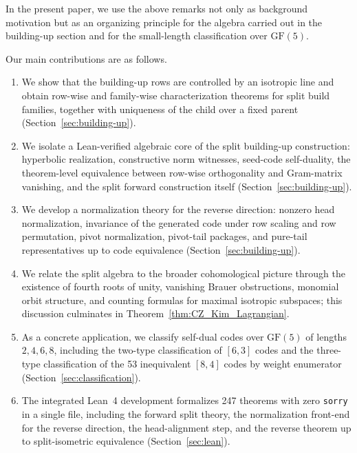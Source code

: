 \documentclass[12pt]{article}
\newcommand{\GF}[1]{\ensuremath{\mathrm{GF}(#1)}}
\begin{document}
In the present paper, we use the above remarks not only as background motivation but as an organizing principle for the algebra carried out in the building-up section and for the small-length classification over $\GF{5}$.

Our main contributions are as follows.
\begin{enumerate}[label=(\arabic*)]

\item We show that the building-up rows are controlled by an isotropic line and obtain row-wise and family-wise characterization theorems for split build families, together with uniqueness of the child over a fixed parent (Section~\ref{sec:building-up}).

\item We isolate a Lean-verified algebraic core of the split building-up construction: hyperbolic realization, constructive norm witnesses, seed-code self-duality, the theorem-level equivalence between row-wise orthogonality and Gram-matrix vanishing, and the split forward construction itself (Section~\ref{sec:building-up}).

\item We develop a normalization theory for the reverse direction: nonzero head normalization, invariance of the generated code under row scaling and row permutation, pivot normalization, pivot-tail packages, and pure-tail representatives up to code equivalence (Section~\ref{sec:building-up}).

\item We relate the split algebra to the broader cohomological picture through the existence of fourth roots of unity, vanishing Brauer obstructions, monomial orbit structure, and counting formulas for maximal isotropic subspaces; this discussion culminates in Theorem~\ref{thm:CZ_Kim_Lagrangian}.

\item As a concrete application, we classify self-dual codes over $\GF{5}$ of lengths $2,4,6,8$, including the two-type classification of $[6,3]$ codes and the three-type classification of the 53 inequivalent $[8,4]$ codes by weight enumerator (Section~\ref{sec:classification}).

\item The integrated Lean~4 development formalizes 247 theorems with zero \texttt{sorry} in a single file, including the forward split theory, the normalization front-end for the reverse direction, the head-alignment step, and the reverse theorem up to split-isometric equivalence (Section~\ref{sec:lean}).
\end{enumerate}
\end{document}
